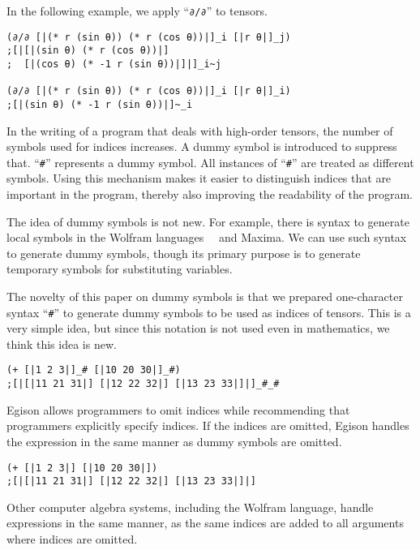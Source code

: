 \documentclass[acmlarge]{acmart}
\begin{document}
In the following example, we apply ``\texttt{∂/∂}'' to tensors.

{\footnotesize
\begin{verbatim}
(∂/∂ [|(* r (sin θ)) (* r (cos θ))|]_i [|r θ|]_j)
;[|[|(sin θ) (* r (cos θ))|]
;  [|(cos θ) (* -1 r (sin θ))|]|]_i~j

(∂/∂ [|(* r (sin θ)) (* r (cos θ))|]_i [|r θ|]_i)
;[|(sin θ) (* -1 r (sin θ))|]~_i
\end{verbatim}
}

In the writing of a program that deals with high-order tensors, the number of symbols used for indices increases.
A dummy symbol is introduced to suppress that.
``\texttt{\#}'' represents a dummy symbol.
All instances of ``\texttt{\#}'' are treated as different symbols.
Using this mechanism makes it easier to distinguish indices that are important in the program, thereby also improving the readability of the program.

The idea of dummy symbols is not new.
For example, there is syntax to generate local symbols in the Wolfram languages~\cite{wolframModule}~ and Maxima\cite{sympyDummySymbol}.
We can use such syntax to generate dummy symbols, though its primary purpose is to generate temporary symbols for substituting variables.

The novelty of this paper on dummy symbols is that we prepared one-character syntax ``\texttt{\#}'' to generate dummy symbols to be used as indices of tensors.
This is a very simple idea, but since this notation is not used even in mathematics, we think this idea is new.

{\footnotesize
\begin{verbatim}
(+ [|1 2 3|]_# [|10 20 30|]_#)
;[|[|11 21 31|] [|12 22 32|] [|13 23 33|]|]_#_#
\end{verbatim}
}

Egison allows programmers to omit indices while recommending that programmers explicitly specify indices.
If the indices are omitted, Egison handles the expression in the same manner as dummy symbols are omitted.

{\footnotesize
\begin{verbatim}
(+ [|1 2 3|] [|10 20 30|])
;[|[|11 21 31|] [|12 22 32|] [|13 23 33|]|]
\end{verbatim}
}

Other computer algebra systems, including the Wolfram language, handle expressions in the same manner, as the same indices are added to all arguments where indices are omitted.
\end{document}
